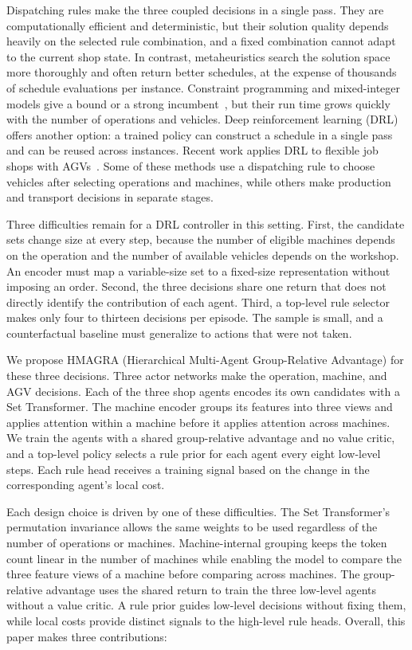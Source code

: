 Dispatching rules make the three coupled decisions in a single pass. They are computationally efficient and
deterministic, but their solution quality depends heavily on the selected rule combination,
and a fixed combination cannot adapt to the current shop state. In contrast, metaheuristics search the
solution space more thoroughly and often return better schedules, at the expense of thousands of schedule
evaluations per instance. Constraint programming and mixed-integer models give a bound or a strong
incumbent~\cite{yao2026cp}, but their run time grows quickly with the number of
operations and vehicles. Deep reinforcement
learning (DRL) offers another option: a trained policy can construct a
schedule in a single pass and can be reused across instances. Recent work
applies DRL to flexible job shops with AGVs~\cite{li2025tsmc,li2025plcsp,shi2025nested,
wang2025hierarchical}. Some of these methods use a dispatching rule to choose
vehicles after selecting operations and machines, while others make
production and transport decisions in separate stages.

Three difficulties remain for a DRL controller in this setting. First, the
candidate sets change size at every step, because the number of eligible
machines depends on the operation and the number of available vehicles depends
on the workshop. An encoder must map a variable-size set to a fixed-size
representation without imposing an order. Second, the three decisions share
one return that does not directly identify the contribution of each agent. Third, a top-level rule selector makes only
four to thirteen decisions per episode. The sample is small, and a
counterfactual baseline must generalize to actions that were not taken.

We propose HMAGRA (Hierarchical Multi-Agent Group-Relative Advantage) for these three decisions. Three actor networks make the operation, machine, and AGV
decisions. Each of the three shop agents encodes its own candidates with a
Set Transformer. The machine encoder groups its features into three views and
applies attention within a machine before it applies attention across machines. We train the
agents with a shared group-relative advantage and no value critic, and a
top-level policy selects a rule prior for each agent every eight low-level
steps. Each rule head receives a training signal based on the change in
the corresponding agent's local cost.

Each design choice is driven by one of these difficulties. The Set Transformer’s permutation invariance
allows the same weights to be used regardless of the number of operations or machines.
Machine-internal grouping keeps the token count linear in the number of machines while enabling the model
to compare the three feature views of a machine before comparing across machines.
The group-relative advantage uses the shared return to train the three low-level agents without a value critic.
A rule prior guides low-level decisions without fixing them, while local costs provide distinct signals to the high-level rule heads. Overall, this paper makes three contributions:


